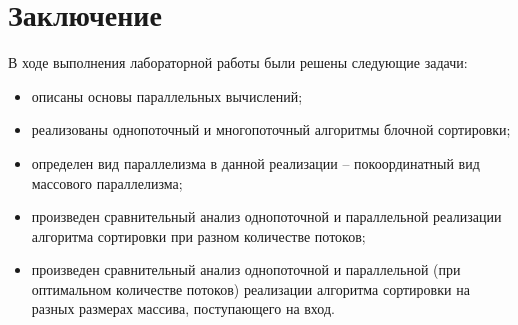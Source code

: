 \chapter*{Заключение}

В ходе выполнения лабораторной работы были решены следующие задачи:

\begin{itemize}
	\item описаны основы параллельных вычислений;
	\item реализованы однопоточный и многопоточный алгоритмы блочной сортировки;
	\item определен вид параллелизма в данной реализации -- покоординатный вид массового параллелизма;
	\item произведен сравнительный анализ однопоточной и параллельной реализации алгоритма сортировки при разном количестве потоков;
	\item произведен сравнительный анализ однопоточной и параллельной (при оптимальном количестве потоков) реализации алгоритма сортировки на разных размерах массива, поступающего на вход.
\end{itemize}

